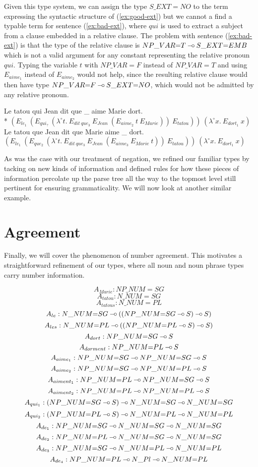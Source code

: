 Given this type system, we can assign the type $S\_EXT{=}NO$ to the term
expressing the syntactic structure of (\ref{ex:good-ext}) but we cannot
a find a typable term for sentence (\ref{ex:bad-ext}), where $qui$ is
used to extract a subject from a clause embedded in a relative clause.
The problem with sentence (\ref{ex:bad-ext}) is that the type of the
relative clause is $NP\_VAR{=}T \mathbin{{-}\mkern-3.5mu{\circ}} S\_EXT{=}EMB$ which is not a valid
argument for any constant representing the relative pronoun
$qui$. Typing the variable $t$ with $NP\_VAR{=}F$ instead of
$NP\_VAR{=}T$ and using $E_{aime_1}$ instead of $E_{aime_2}$ would not
help, since the resulting relative clause would then have type
$NP\_VAR{=}F \mathbin{{-}\mkern-3.5mu{\circ}} S\_EXT{=}NO$, which would not be admitted by any
relative pronoun.

\begin{exe}
  \ex * \label{ex:bad-ext} Le tatou qui Jean dit que \_ aime Marie dort. \\
      * $(E_{le_1}\ (E_{qui_?}\ (\lambda^{\circ} t.\ E_{dit\ que_3}\ E_{Jean}\ (E_{aime_2}\ t\ E_{Marie}))\ E_{tatou}))\ (\lambda^{\circ} x.\ E_{dort_1}\ x)$
  \ex \label{ex:good-ext} Le tatou que Jean dit que Marie aime \_ dort. \\
      $(E_{le_1}\ (E_{que_2}\ (\lambda^{\circ} t.\ E_{dit\ que_3}\ E_{Jean}\ (E_{aime_3}\ E_{Marie}\ t))\ E_{tatou}))\ (\lambda^{\circ} x.\ E_{dort_1}\ x)$
\end{exe}

As was the case with our treatment of negation, we refined our familiar
types by tacking on new kinds of information and defined rules for how
these pieces of information percolate up the parse tree all the way to
the topmost level still pertinent for ensuring grammaticality. We will
now look at another similar example.


\section{Agreement}

Finally, we will cover the phenomenon of number agreement. This
motivates a straightforward refinement of our types, where all noun and
noun phrase types carry number information.

$$
A_{Marie} : NP\_NUM{=}SG
$$
$$
A_{tatou} : N\_NUM{=}SG
$$
$$
A_{tatous} : N\_NUM{=}PL
$$
$$
A_{le} : N\_NUM{=}SG \mathbin{{-}\mkern-3.5mu{\circ}} ((NP\_NUM{=}SG \mathbin{{-}\mkern-3.5mu{\circ}} S) \mathbin{{-}\mkern-3.5mu{\circ}} S)
$$
$$
A_{les} : N\_NUM{=}PL \mathbin{{-}\mkern-3.5mu{\circ}} ((NP\_NUM{=}PL \mathbin{{-}\mkern-3.5mu{\circ}} S) \mathbin{{-}\mkern-3.5mu{\circ}} S)
$$
$$
A_{dort} : NP\_NUM{=}SG \mathbin{{-}\mkern-3.5mu{\circ}} S
$$
$$
A_{dorment} : NP\_NUM{=}PL \mathbin{{-}\mkern-3.5mu{\circ}} S
$$
$$
A_{aime_1} : NP\_NUM{=}SG \mathbin{{-}\mkern-3.5mu{\circ}} NP\_NUM{=}SG \mathbin{{-}\mkern-3.5mu{\circ}} S
$$
$$
A_{aime_2} : NP\_NUM{=}SG \mathbin{{-}\mkern-3.5mu{\circ}} NP\_NUM{=}PL \mathbin{{-}\mkern-3.5mu{\circ}} S
$$
$$
A_{aiment_1} : NP\_NUM{=}PL \mathbin{{-}\mkern-3.5mu{\circ}} NP\_NUM{=}SG \mathbin{{-}\mkern-3.5mu{\circ}} S
$$
$$
A_{aiment_2} : NP\_NUM{=}PL \mathbin{{-}\mkern-3.5mu{\circ}} NP\_NUM{=}PL \mathbin{{-}\mkern-3.5mu{\circ}} S
$$
$$
A_{qui_1} : (NP\_NUM{=}SG \mathbin{{-}\mkern-3.5mu{\circ}} S) \mathbin{{-}\mkern-3.5mu{\circ}} N\_NUM{=}SG \mathbin{{-}\mkern-3.5mu{\circ}} N\_NUM{=}SG
$$
$$
A_{qui_2} : (NP\_NUM{=}PL \mathbin{{-}\mkern-3.5mu{\circ}} S) \mathbin{{-}\mkern-3.5mu{\circ}} N\_NUM{=}PL \mathbin{{-}\mkern-3.5mu{\circ}} N\_NUM{=}PL
$$
$$
A_{de_1} : NP\_NUM{=}SG \mathbin{{-}\mkern-3.5mu{\circ}} N\_NUM{=}SG \mathbin{{-}\mkern-3.5mu{\circ}} N\_NUM{=}SG
$$
$$
A_{de_2} : NP\_NUM{=}PL \mathbin{{-}\mkern-3.5mu{\circ}} N\_NUM{=}SG \mathbin{{-}\mkern-3.5mu{\circ}} N\_NUM{=}SG
$$
$$
A_{de_3} : NP\_NUM{=}SG \mathbin{{-}\mkern-3.5mu{\circ}} N\_NUM{=}PL \mathbin{{-}\mkern-3.5mu{\circ}} N\_NUM{=}PL
$$
$$
A_{de_4} : NP\_NUM{=}PL \mathbin{{-}\mkern-3.5mu{\circ}} N\_Pl \mathbin{{-}\mkern-3.5mu{\circ}} N\_NUM{=}PL
$$


